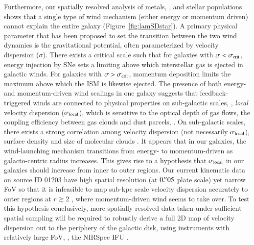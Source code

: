 Furthermore, our spatially resolved analysis of metals, \SFR, and stellar populations shows that a single type of wind mechanism 
(either energy or momentum driven) cannot explain the entire galaxy (Figure~\ref{fig:lamSDstar}).
A primary physical parameter that has been proposed to set the transition between the two wind dynamics is the gravitational 
potential, often parameterized by velocity dispersion ($\sigma$). There exists a critical scale \scrit 
\citep{Murray:2005jt} such that for galaxies with $\sigma<\sigma_{\rm crit}$, energy injection by SNe sets a limiting 
\SFR above which interstellar gas is ejected in galactic winds. For galaxies with $\sigma>\sigma_{\rm crit}$, momentum 
deposition limits the maximum \SFR above which the ISM is likewise ejected.
The presence of both energy- and momentum-driven wind scalings in one galaxy suggests that feedback-triggered winds are connected
to physical properties on sub-galactic scales, \eg, \emph{local} velocity dispersion ($\sigma_{\rm local}$), 
which is sensitive to the optical depth of gas flows, the coupling efficiency between gas clouds and dust 
parcels, \etc.
On sub-galactic scales, there exists a strong correlation among velocity dispersion (not necessarily 
$\sigma_{\rm local}$), surface density and size of molecular clouds \cite[see][and references 
therein]{BallesterosParedes:2011gk}.
It appears that in our galaxies, the wind-launching mechanism transitions from energy- to momentum-driven as 
galacto-centric radius increases.
This gives rise to a hypothesis that $\sigma_{\rm local}$ in our galaxies should increase from inner to outer 
regions.
Our current kinematic data on source ID 01203 have high spatial resolution (at $0\mbox{$.\!^{\prime\prime}$}05$ plate scale) yet narrow FoV so that it 
is infeasible to map sub-kpc scale velocity dispersion accurately to outer regions at $r\gtrsim2$ \kpc, where momentum-driven wind 
seems to take over.
To test this hypothesis conclusively, more spatially resolved data taken under sufficient spatial sampling will be required to 
robustly derive a full 2D map of velocity dispersion out to the periphery of the galactic disk, using instruments 
with relatively large FoV, \eg, the \jwst NIRSpec IFU \citep{Kalirai:2018gs}.

